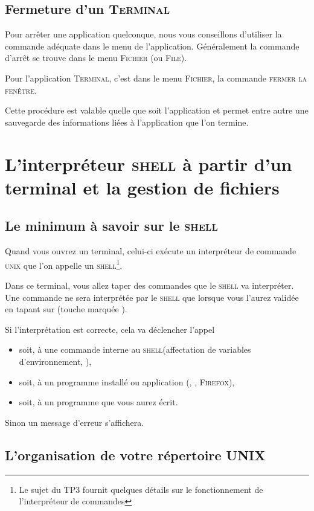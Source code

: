 \documentclass[a4paper,11pt]{article}
\newcommand{\netscape}{\textsc{Firefox}\xspace}
\newcommand{\term}{\textsc{Terminal}\xspace}
\newcommand{\unix}{\textsc{unix}\xspace}
\newcommand{\shell}{\textsc{shell}\xspace}
\begin{document}
\subsection{Fermeture d'un \term}
\label{fermeture}

Pour arrêter une application quelconque, nous vous conseillons
d'utiliser la commande adéquate dans le menu de l'application.
Généralement la commande d'arrêt se trouve dans le menu \textsc{Fichier}
(ou \textsc{File}).

Pour l'application \term, c'est dans le menu \textsc{Fichier}, la commande
\textsc{fermer la fenêtre}.

Cette procédure est valable quelle que soit l'application et permet entre autre
une sauvegarde des informations liées à l'application que l'on termine.

\section{L'interpréteur \shell à partir d'un terminal et la gestion de fichiers}

\subsection{Le minimum à savoir sur le \shell}

Quand vous ouvrez un terminal, celui-ci exécute un interpréteur de commande
\unix que l'on appelle un \shell\footnote{Le sujet du TP3 fournit quelques
détails sur le fonctionnement de l'interpréteur de commandes}.

Dans ce terminal, vous allez taper des commandes que le \shell
va interpréter. Une commande ne sera interprétée par le \shell que lorsque
vous l'aurez validée en tapant sur {\RET} (touche marquée ).

Si l'interprétation est correcte, cela va déclencher l'appel
\begin{itemize}
  \item soit, à une commande interne au \shell (affectation de variables
        d'environnement, ),
  \item soit, à un programme installé ou application (, ,
        \netscape),
  \item soit, à un programme que vous aurez écrit.
\end{itemize}

Sinon un message d'erreur s'affichera.

\subsection{L'organisation de votre répertoire UNIX}
\label{shell}
\end{document}
